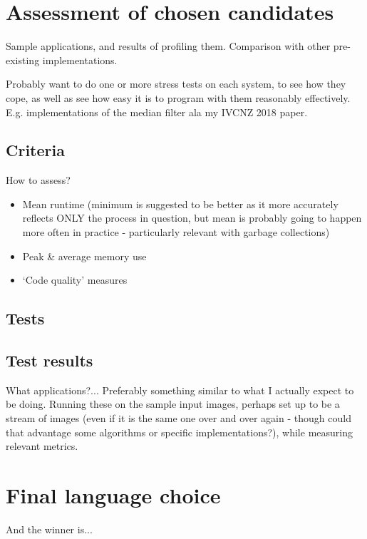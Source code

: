\section{Assessment of chosen candidates}
Sample applications, and results of profiling them.  Comparison with other pre-existing implementations.

Probably want to do one or more stress tests on each system, to see how they cope, as well as see how easy it is to program with them reasonably effectively.  E.g. implementations of the median filter ala my IVCNZ 2018 paper.

\subsection{Criteria}
How to assess?
\begin{itemize}
    \item Mean runtime (minimum is suggested to be better as it more accurately reflects ONLY the process in question, but mean is probably going to happen more often in practice - particularly relevant with garbage collections)
    \item Peak \& average memory use
    \item `Code quality' measures
\end{itemize}

\subsection{Tests}

\subsection{Test results}
What applications?...  Preferably something similar to what I actually expect to be doing.  Running these on the sample input images, perhaps set up to be a stream of images (even if it is the same one over and over again - though could that advantage some algorithms or specific implementations?), while measuring relevant metrics.  %


\section{Final language choice}
And the winner is...



